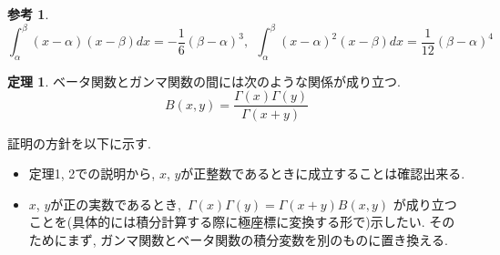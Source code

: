 \documentclass[a4paper,12pt,uplatex,dvipdfmx]{jsarticle}
\theoremstyle{definition}
\newtheorem{theorem}{定理}
\newtheorem*{confer}{参考}
\begin{document}
\begin{confer}
    \[
        \int_\alpha^\beta (x - \alpha)(x - \beta) dx = -\frac{1}{6}(\beta - \alpha)^3,~~ \int_\alpha^\beta (x - \alpha)^2(x - \beta) dx = \frac{1}{12}(\beta - \alpha)^4
    \]
\end{confer}

\newpage
\begin{theorem}
    ベータ関数とガンマ関数の間には次のような関係が成り立つ.
    \[
        B(x, y) = \frac{\Gamma(x)\Gamma(y)}{\Gamma(x + y)}
    \]
\end{theorem}

証明の方針を以下に示す.
\begin{itemize}
    \item 定理1, 2での説明から, $x$, $y$が正整数であるときに成立することは確認出来る.
    \item $x$, $y$が正の実数であるとき,~$\Gamma(x)\Gamma(y) = \Gamma(x + y)B(x, y)$ が成り立つことを(具体的には積分計算する際に極座標に変換する形で)示したい. そのためにまず, ガンマ関数とベータ関数の積分変数を別のものに置き換える.
\end{itemize}
\end{document}
